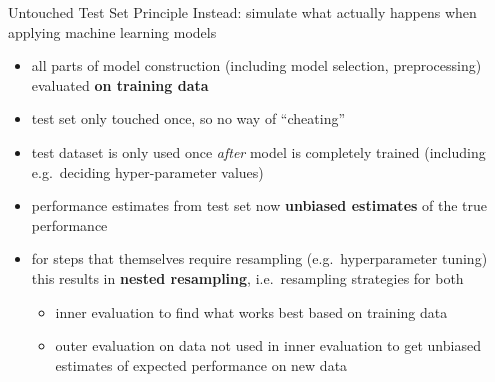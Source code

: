     \begin{frame}[c,allowframebreaks]{Untouched Test Set Principle}
    Instead: simulate what actually happens when applying machine learning
    models

    \begin{itemize}
    \item all parts of model construction (including model selection,
      preprocessing) evaluated \textbf{on training data}
    \item test set only touched once, so no way of ``cheating''
    \item test dataset is only used once \emph{after} model is completely
        trained (including e.g.\ deciding hyper-parameter values)
    \item performance estimates from test set now \textbf{unbiased estimates} of the true performance

    \framebreak

    \item for steps that themselves require resampling (e.g.\ hyperparameter tuning) this results
      in \textbf{nested resampling}, i.e.\ resampling strategies for both
      \begin{itemize} 
      \item inner evaluation to find what works best based on training data 
      \item outer evaluation on data not used in inner evaluation to get unbiased estimates of expected performance on new data
      \end{itemize}
    \end{itemize}
    \end{frame}

